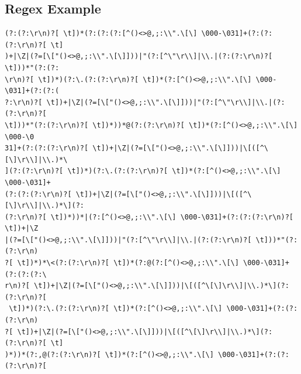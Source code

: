 \documentclass{beamer}
\begin{document}
\subsection{Regex Example}
\begin{frame}[fragile]
\begingroup
 \fontsize{6pt}{8pt}\selectfont
\begin{verbatim}
(?:(?:\r\n)?[ \t])*(?:(?:(?:[^()<>@,;:\\".\[\] \000-\031]+(?:(?:(?:\r\n)?[ \t]
)+|\Z|(?=[\["()<>@,;:\\".\[\]]))|"(?:[^\"\r\\]|\\.|(?:(?:\r\n)?[ \t]))*"(?:(?:
\r\n)?[ \t])*)(?:\.(?:(?:\r\n)?[ \t])*(?:[^()<>@,;:\\".\[\] \000-\031]+(?:(?:(
?:\r\n)?[ \t])+|\Z|(?=[\["()<>@,;:\\".\[\]]))|"(?:[^\"\r\\]|\\.|(?:(?:\r\n)?[ 
\t]))*"(?:(?:\r\n)?[ \t])*))*@(?:(?:\r\n)?[ \t])*(?:[^()<>@,;:\\".\[\] \000-\0
31]+(?:(?:(?:\r\n)?[ \t])+|\Z|(?=[\["()<>@,;:\\".\[\]]))|\[([^\[\]\r\\]|\\.)*\
](?:(?:\r\n)?[ \t])*)(?:\.(?:(?:\r\n)?[ \t])*(?:[^()<>@,;:\\".\[\] \000-\031]+
(?:(?:(?:\r\n)?[ \t])+|\Z|(?=[\["()<>@,;:\\".\[\]]))|\[([^\[\]\r\\]|\\.)*\](?:
(?:\r\n)?[ \t])*))*|(?:[^()<>@,;:\\".\[\] \000-\031]+(?:(?:(?:\r\n)?[ \t])+|\Z
|(?=[\["()<>@,;:\\".\[\]]))|"(?:[^\"\r\\]|\\.|(?:(?:\r\n)?[ \t]))*"(?:(?:\r\n)
?[ \t])*)*\<(?:(?:\r\n)?[ \t])*(?:@(?:[^()<>@,;:\\".\[\] \000-\031]+(?:(?:(?:\
r\n)?[ \t])+|\Z|(?=[\["()<>@,;:\\".\[\]]))|\[([^\[\]\r\\]|\\.)*\](?:(?:\r\n)?[
 \t])*)(?:\.(?:(?:\r\n)?[ \t])*(?:[^()<>@,;:\\".\[\] \000-\031]+(?:(?:(?:\r\n)
?[ \t])+|\Z|(?=[\["()<>@,;:\\".\[\]]))|\[([^\[\]\r\\]|\\.)*\](?:(?:\r\n)?[ \t]
)*))*(?:,@(?:(?:\r\n)?[ \t])*(?:[^()<>@,;:\\".\[\] \000-\031]+(?:(?:(?:\r\n)?[

\end{verbatim}
\end{frame}
\end{document}
